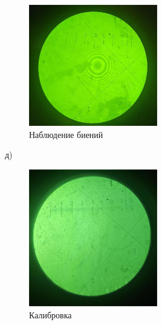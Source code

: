 \documentclass[a4paper,12pt]{article} %
\begin{document}
\begin{figure}[h!!]
    \centering
    \includegraphics[width=0.5\textwidth]{биения.jpg}
    \caption{Наблюдение биений}
    \label{setup}
\end{figure}
д)
\begin{figure}[h]
    \centering
    \includegraphics[width=0.5\textwidth]{калибровка.jpg}
    \caption{Калибровка}
    \label{setup}
\end{figure}
\end{document}
